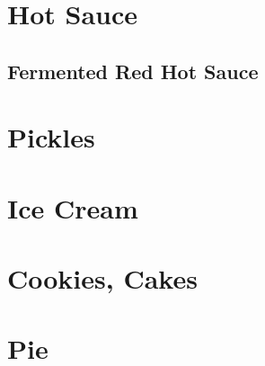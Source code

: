 \chapter{Hot Sauce}
\minitoc
\clearpage
{

	\section[Red Hot Sauce]{Fermented Red Hot Sauce}
	\let\section\subsection
	\let\subsection\subsubsection
	
}

\chapter{Pickles}
\minitoc
\clearpage


\chapter{Ice Cream}
\minitoc
\clearpage


\chapter{Cookies, Cakes}
\minitoc
\clearpage






\chapter{Pie}
\minitoc
\clearpage





\clearpage
{}
\printbibliography

\clearpage
{}
\printindex


